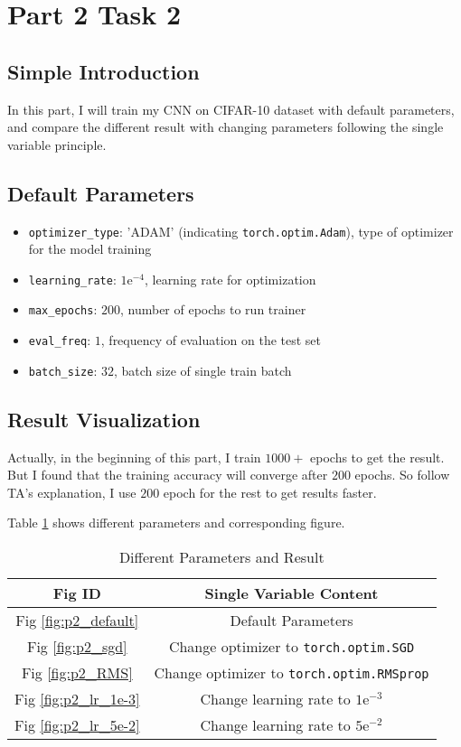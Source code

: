 \section{Part 2 Task 2}

\subsection{Simple Introduction}

In this part, I will train my CNN on CIFAR-10 dataset with default parameters, and compare the different result with changing parameters following the single variable principle.

\subsection{Default Parameters}

\begin{itemize}
    \item \texttt{optimizer\_type}: 'ADAM' (indicating \texttt{torch.optim.Adam}), type of optimizer for the model training
    \item \texttt{learning\_rate}: $1\mathrm{e}^{-4}$, learning rate for optimization
    \item \texttt{max\_epochs}: $200$, number of epochs to run trainer
    \item \texttt{eval\_freq}: $1$, frequency of evaluation on the test set
    \item \texttt{batch\_size}: $32$, batch size of single train batch
\end{itemize}

\subsection{Result Visualization}

Actually, in the beginning of this part, I train $1000+$ epochs to get the result. But I found that the training accuracy will converge after $200$ epochs.
So follow TA’s explanation, I use $200$ epoch for the rest to get results faster.

Table \ref{tab:p2_res_para} shows different parameters and corresponding figure.

\begin{table}[!h]
\centering\caption{Different Parameters and Result}
\label{tab:p2_res_para}
\begin{tabular}{|c|c|}
\hline
\textbf{Fig ID} & \textbf{Single Variable Content} \\
\hline
Fig \ref{fig:p2_default} & Default Parameters \\ \hline
Fig \ref{fig:p2_sgd} & Change optimizer to \texttt{torch.optim.SGD} \\ \hline
Fig \ref{fig:p2_RMS} & Change optimizer to \texttt{torch.optim.RMSprop} \\ \hline
Fig \ref{fig:p2_lr_1e-3} & Change learning rate to $1\mathrm{e}^{-3}$ \\ \hline
Fig \ref{fig:p2_lr_5e-2} & Change learning rate to $5\mathrm{e}^{-2}$ \\ \hline
\end{tabular}
\end{table}

